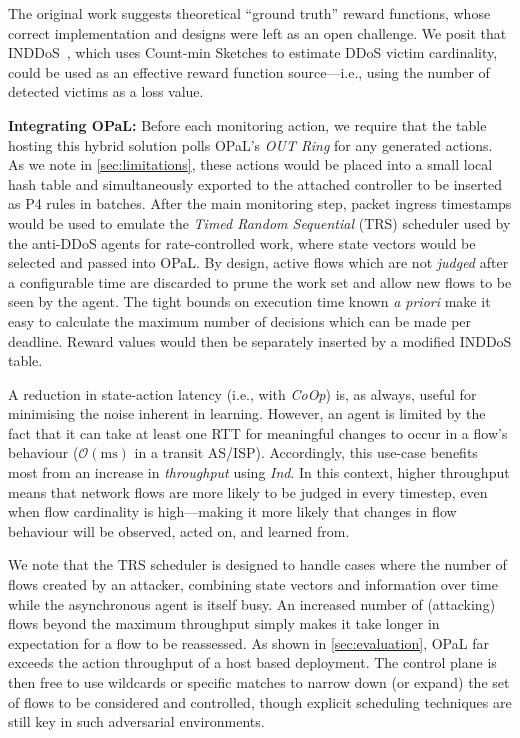\documentclass[
sigconf,natbib=false
]{acmart}
\newcommand{\fakepara}[1]{\noindent\textbf{#1:}}
\newcommand{\approachshort}{OPaL}
\newcommand{\Coopfw}{\emph{CoOp}}
\newcommand{\Indfw}{\emph{Ind}}
\begin{document}
The original work suggests theoretical ``ground truth'' reward functions, whose correct implementation and designs were left as an open challenge. 
We posit that INDDoS~\parencite{tnms-ddos-victim-ident}, which uses Count-min Sketches to estimate DDoS victim cardinality, could be used as an effective reward function source---i.e., using the number of detected victims as a loss value.

\fakepara{Integrating \approachshort}
Before each monitoring action, we require that the table hosting this hybrid solution polls \approachshort{}'s \emph{OUT Ring} for any generated actions.
As we note in \cref{sec:limitations}, these actions would be placed into a small local hash table and simultaneously exported to the attached controller to be inserted as P4 rules in batches.
After the main monitoring step, packet ingress timestamps would be used to emulate the \emph{Timed Random Sequential} (TRS) scheduler used by the anti-DDoS agents for rate-controlled work, where state vectors would be selected and passed into \approachshort.
By design, active flows which are not \emph{judged} after a configurable time are discarded to prune the work set and allow new flows to be seen by the agent.
The tight bounds on execution time known \emph{a priori} make it easy to calculate the maximum number of decisions which can be made per deadline.
Reward values would then be separately inserted by a modified INDDoS table.


A reduction in state-action latency (i.e., with \Coopfw) is, as always, useful for minimising the noise inherent in learning.
However, an agent is limited by the fact that it can take at least one RTT for meaningful changes to occur in a flow's behaviour ($\mathcal{O}{\left(\si{\milli\second}\right)}$ in a transit AS/ISP).
Accordingly, this use-case benefits most from an increase in \emph{throughput} using \Indfw{}.
In this context, higher throughput means that network flows are more likely to be judged in every timestep, even when flow cardinality is high---making it more likely that changes in flow behaviour will be observed, acted on, and learned from.

We note that the TRS scheduler is designed to handle cases where the number of flows created by an attacker, combining state vectors and information over time while the asynchronous agent is itself busy.
An increased number of (attacking) flows beyond the maximum throughput simply makes it take longer in expectation for a flow to be reassessed.
As shown in \cref{sec:evaluation}, \approachshort{} far exceeds the action throughput of a host based deployment.
The control plane is then free to use wildcards or specific matches to narrow down (or expand) the set of flows to be considered and controlled, though explicit scheduling techniques are still key in such adversarial environments.
\end{document}
